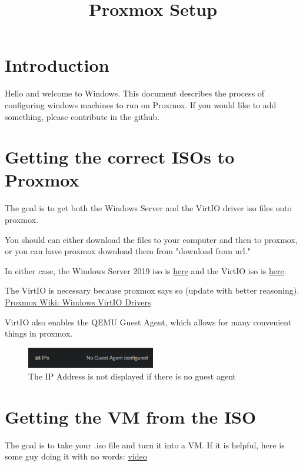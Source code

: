 \documentclass{article}
\title{Proxmox Setup}
\begin{document}
\maketitle

\graphicspath{ {./Images/} }
\tableofcontents

\section{Introduction}
Hello and welcome to Windows. This document describes the process of configuring windows machines to run on Proxmox. If you would like to add something, please contribute in the github.

\section{Getting the correct ISOs to Proxmox}
The goal is to get both the Windows Server and the VirtIO driver iso files onto proxmox.

You should can either download the files to your computer and then to proxmox, or you can have proxmox download them from "download from url."

In either case, the Windows Server 2019 iso is \href{http://www.microsoft.com/en-us/evalcenter/download-windows-server-2019
}{here} and the VirtIO iso is \href{https://fedorapeople.org/groups/virt/virtio-win/direct-downloads/stable-virtio/}{here}.

The VirtIO is necessary because proxmox says so (update with better reasoning). \href{https://pve.proxmox.com/wiki/Windows_VirtIO_Drivers#Windows_OS_Support}{Proxmox Wiki: Windows VirtIO Drivers}

VirtIO also enables the QEMU Guest Agent, which allows for many convenient things in proxmox.

\begin{figure}[h]
    \centering
    \includegraphics[width=0.5\textwidth]{noGuestAgent.png}
    \caption{The IP Address is not displayed if there is no guest agent}
    \label{fig:noGuestAgent}
\end{figure}

\section{Getting the VM from the ISO}
The goal is to take your .iso file and turn it into a VM. If it is helpful, here is some guy doing it with no words: \href{https://www.youtube.com/watch?v=lwORpWEHiDE&t=5m}{video} 
\end{document}
